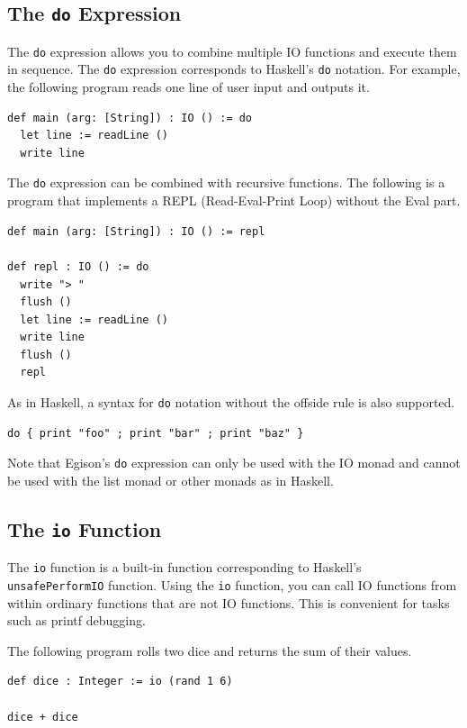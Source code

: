 \subsection{The \texttt{do} Expression}

The \lstinline{do} expression allows you to combine multiple IO functions and execute them in sequence.
The \lstinline{do} expression corresponds to Haskell's \lstinline{do} notation.
For example, the following program reads one line of user input and outputs it.
\begin{lstlisting}[language=egison,numbers=none]
def main (arg: [String]) : IO () := do
  let line := readLine ()
  write line
\end{lstlisting}

The \lstinline{do} expression can be combined with recursive functions.
The following is a program that implements a REPL (Read-Eval-Print Loop) without the Eval part.
\begin{lstlisting}[language=egison,numbers=none]
def main (arg: [String]) : IO () := repl

def repl : IO () := do
  write "> "
  flush ()
  let line := readLine ()
  write line
  flush ()
  repl
\end{lstlisting}

As in Haskell, a syntax for \lstinline{do} notation without the offside rule is also supported.
\begin{lstlisting}[language=egison,numbers=none]
do { print "foo" ; print "bar" ; print "baz" }
\end{lstlisting}

Note that Egison's \lstinline{do} expression can only be used with the IO monad and cannot be used with the list monad or other monads as in Haskell.

\subsection{The \texttt{io} Function}

The \lstinline{io} function is a built-in function corresponding to Haskell's \lstinline{unsafePerformIO} function.
Using the \lstinline{io} function, you can call IO functions from within ordinary functions that are not IO functions.
This is convenient for tasks such as printf debugging.

The following program rolls two dice and returns the sum of their values.
\begin{lstlisting}[language=egison,numbers=none]
def dice : Integer := io (rand 1 6)

dice + dice
\end{lstlisting}

